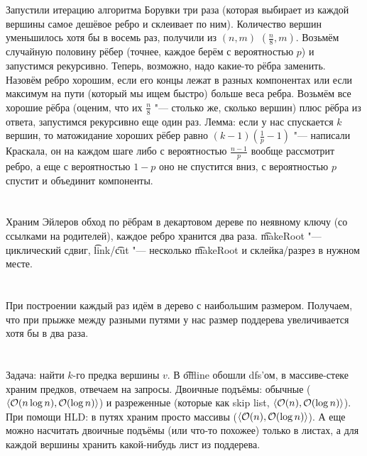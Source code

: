 \section{} %
Запустили итерацию алгоритма Борувки три раза (которая выбирает из каждой вершины самое дешёвое ребро и склеивает по ним).
Количество вершин уменьшилось хотя бы в восемь раз, получили из $(n, m)$ $(\frac n 8, m)$.
Возьмём случайную половину рёбер (точнее, каждое берём с вероятностью $p$) и запустимся рекурсивно.
Теперь, возможно, надо какие-то рёбра заменить.
Назовём ребро хорошим, если его концы лежат в разных компонентах или если максимум на пути (который мы ищем быстро) больше веса ребра.
Возьмём все хорошие рёбра (оценим, что их $\frac n 8$ "--- столько же, сколько вершин) плюс рёбра из ответа, запустимся рекурсивно еще один раз.
Лемма: если у нас спускается $k$ вершин, то матожидание хороших рёбер равно $(k-1)(\frac 1 p - 1)$ "--- написали Краскала, он на каждом
шаге либо с вероятностью $\frac{n-1}{p}$ вообще рассмотрит ребро, а еще с вероятностью $1-p$ оно не спустится вниз, с вероятностью $p$ спустит и объединит компоненты.

\section{} %
Храним Эйлеров обход по рёбрам в декартовом дереве по неявному ключу (со ссылками на родителей), каждое ребро хранится два раза.
\t{makeRoot} "--- циклический сдвиг, \t{link}/\t{cut} "--- несколько \t{makeRoot} и склейка/разрез в нужном месте.

\section{} %
При построении каждый раз идём в дерево с наибольшим размером.
Получаем, что при прыжке между разными путями у нас размер поддерева увеличивается хотя бы в два раза.

\section{} %
Задача: найти $k$-го предка вершины $v$.
В \t{offline} обошли dfs'ом, в массиве-стеке храним предков, отвечаем на запросы.
Двоичные подъёмы: обычные ($\left<\mathcal{O}(n\log n), \mathcal{O}(\log n)\right>$) и разреженные (которые как skip list, $\left<\mathcal{O}(n), \mathcal{O}(\log n)\right>$).
При помощи HLD: в путях храним просто массивы ($\left<\mathcal{O}(n), \mathcal{O}(\log n)\right>$).
А еще можно насчитать двоичные подъёмы (или что-то похожее) только в листах, а для каждой вершины хранить какой-нибудь лист из поддерева.

